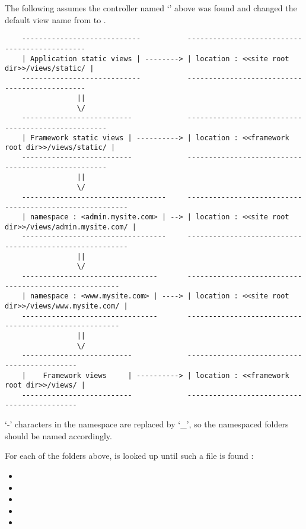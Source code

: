\documentclass[pdftex,12pt,a4paper]{article}
\begin{document}
The following assumes the controller named `' above was found and changed the default view name from  to .

\begin{center}
\begin{unbreakable}
{\scriptsize
\begin{verbatim}
	----------------------------           ----------------------------------------------
	| Application static views | --------> | location : <<site root dir>>/views/static/ |
	----------------------------           ----------------------------------------------
	             ||
	             \/
	--------------------------             ---------------------------------------------------
	| Framework static views | ----------> | location : <<framework root dir>>/views/static/ |
	--------------------------             ---------------------------------------------------
	             ||
	             \/
	----------------------------------     --------------------------------------------------------
	| namespace : <admin.mysite.com> | --> | location : <<site root dir>>/views/admin.mysite.com/ |
	----------------------------------     --------------------------------------------------------
	             ||
	             \/
	--------------------------------       ------------------------------------------------------
	| namespace : <www.mysite.com> | ----> | location : <<site root dir>>/views/www.mysite.com/ |
	--------------------------------       ------------------------------------------------------
	             ||
	             \/
	--------------------------             --------------------------------------------
	|    Framework views     | ----------> | location : <<framework root dir>>/views/ |
	--------------------------             --------------------------------------------
\end{verbatim}
}
\end{unbreakable}
\end{center}
\begin{note}
`-' characters in the namespace are replaced by `\_', so the namespaced folders should be named accordingly.
\end{note}

For each of the folders above,  is looked up until such a file is found :
\begin{itemize}
	\item {}
	\item {}
	\item {}
	\item {}
	\item {}
\end{itemize}
\end{document}
